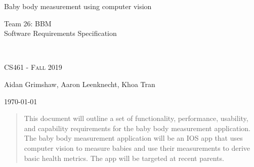 \documentclass[letterpaper,10pt,draftclsnofoot,onecolumn,compsoc]{IEEEtran}
\def\name{Aidan Grimshaw, Aaron Leenknecht, Khoa Tran}
\begin{document}
\begin{titlepage}
\centering
\vspace*{6cm}
{\scshape\LARGE \begin{singlespace}Baby body measurement using computer vision\\ \end{singlespace} Team 26: BBM \\ Software Requirements Specification } \\
	{\scshape\Large CS461 - Fall 2019 \par}
	\vspace{.5cm}
	\name \par
    {\large \today \par} 
	\vspace*{1cm}
	
\begin{abstract}
\begin{singlespace}
This document will outline a set of functionality, performance, usability, and capability requirements for the baby body measurement application. The baby body measurement application will be an IOS app that uses computer vision to measure babies and use their measurements to derive basic health metrics. The app will be targeted at recent parents.
\end{singlespace}
\end{abstract}

\end{titlepage}

\newpage

\tableofcontents

\thispagestyle{empty}

\newpage

\end{document}
